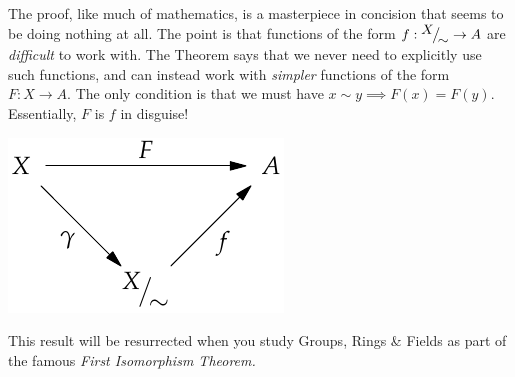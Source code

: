 \begin{minipage}[t]{0.65\linewidth}\vspace{0pt}
	The proof, like much of mathematics, is a masterpiece in concision that seems to be doing nothing at all. The point is that functions of the form $f:{}^{\textstyle {X}}\!\big/_{\textstyle \!{\sim}}\to A$ are \emph{difficult} to work with. The Theorem says that we never need to explicitly use such functions, and can instead work with \emph{simpler} functions of the form $F:X\to A$. The only condition is that we must have $x\sim y\implies F(x)=F(y)$. Essentially, $F$ is $f$ in disguise!
\end{minipage}
\hfill
\begin{minipage}[t]{0.3\linewidth}\vspace{0pt}
	\includegraphics[width=\textwidth]{relations-17-isomthm}
\end{minipage}\par

This result will be resurrected when you study Groups, Rings \& Fields as part of the famous \emph{First Isomorphism Theorem.}


% 

